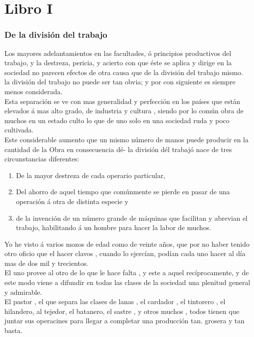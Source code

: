 \documentclass[10pt]{article}
\begin{document}
\part*{\center Libro I}
\begin{multicols}{2}
\section*{De la división del trabajo}
Los mayores adelantamientos en las facultades, ó principios productivos del trabajo, y la destreza, pericia, y acierto con que éste se aplica y dirige en la sociedad no parecen efectos de otra causa que de la división del trabajo mismo.\\
la división del trabajo no puede ser tan obvia; y por con siguiente es siempre menos  considerada.\\
Esta separación se ve con mas generalidad y perfección en los países que están elevados á mas alto grado, de industria y cultura , siendo por lo común obra de muchos en un estado culto lo que de uno solo en una sociedad ruda y poco cultivada.\\
Este considerable aumento que un mismo número de manos puede producir en la cantidad de la Obra en consecuencia dé- la división dél trabajó nace de tres circunstancias diferentes:
\begin{enumerate}
\item De la mayor destreza de cada operario particular,
\item Del ahorro de aquel tiempo que comúnmente se pierde en pasar de una operación á otra de distinta especie y
\item de la invención de un número grande de máquinas que facilitan y abrevian el trabajo, habilitando á un hombre para hacer la labor de muchos.
\end{enumerate}
Yo he visto á varios mozos de edad como de veinte años, que por no haber tenido otro oficio que el hacer clavos , cuando lo ejercían, podían cada uno hacer al día mas de dos mil y trecientos.\\
El uno provee al otro de lo que le hace falta , y este a aquel recíprocamente, y de este modo viene a difundir en todas las clases de la sociedad una plenitud general y admirable.\\
El pastor , el que separa las clases de lanas , el cardador , el tintorero , el hilandero, al tejedor, el batanero, el sastre , y otros muchos , todos tienen que juntar sus operacines para llegar a completar una producción tan. grosera y tan basta.\\

\end{multicols}
\end{document}
